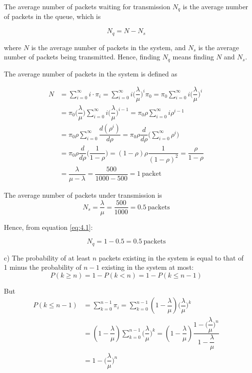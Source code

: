 The average number of packets waiting for transmission $N_q$ is the average
number of packets in the queue, which is

\begin{equation}
  N_q = N - N_s
  \label{eq:4.1}
\end{equation}

where $N$ is the average number of packets in the system, and $N_s$ is the
average number of packets being transmitted. Hence, finding $N_q$ means finding
$N$ and $N_s$.

The average number of packets in the system is defined as

\begin{align*}
  N &= \sum_{i=0}^{\infty} i \cdot \pi_i = \sum_{i=0}^{\infty} i \Big(\dfrac{\lambda}{\mu}\Big)^i \pi_0 =
  \pi_0 \sum_{i=0}^{\infty} i \Big(\dfrac{\lambda}{\mu}\Big)^i \\
  ~ &= \pi_0 \Big(\dfrac{\lambda}{\mu}\Big) \sum_{i=0}^{\infty} i \Big(\dfrac{\lambda}{\mu}\Big)^{i-1} =
  \pi_0 \rho \sum_{i=0}^{\infty} i \rho^{i-1} \\
  ~ &= \pi_0 \rho \sum_{i=0}^{\infty} \dfrac{d(\rho^i)}{d\rho} = \pi_0 \rho \dfrac{d}{d\rho} \Big(\sum_{i=0}^{\infty} \rho^i \Big) \\
  ~ &= \pi_0 \rho \dfrac{d}{d\rho} \Big(\dfrac{1}{1-\rho}\Big) = (1-\rho) \rho \dfrac{1}{(1-\rho)^2} = \dfrac{\rho}{1-\rho} \\
  ~ &= \dfrac{\lambda}{\mu - \lambda} = \dfrac{500}{1000-500} = 1\ \text{packet}
\end{align*}

The average number of packets under transmission is
$$N_s = \dfrac{\lambda}{\mu} = \dfrac{500}{1000} = 0.5\ \text{packets}$$

Hence, from equation \ref{eq:4.1}:

$$N_q = 1 - 0.5 = 0.5\ \text{packets}$$

c)
The probability of at least $n$ packets existing in the system is equal to that
of 1 minus the probability of $n-1$ existing in the system at most:
$$P(k \geq n) = 1 - P(k < n) = 1 - P(k \leq n-1)$$

But
\begin{align*}
  P(k \leq n-1) &= \sum_{k=0}^{n-1} \pi_i = \sum_{k=0}^{n-1} (1-\dfrac{\lambda}{\mu})\Big(\dfrac{\lambda}{\mu}\Big)^k \\
  ~             &= (1-\dfrac{\lambda}{\mu})\sum_{k=0}^{n-1} \Big(\dfrac{\lambda}{\mu}\Big)^k =
                   (1-\dfrac{\lambda}{\mu}) \dfrac{1-\Big(\dfrac{\lambda}{\mu}\Big)^n}{1-\dfrac{\lambda}{\mu}} \\
  ~             &= 1-\Big(\dfrac{\lambda}{\mu}\Big)^n
\end{align*}

